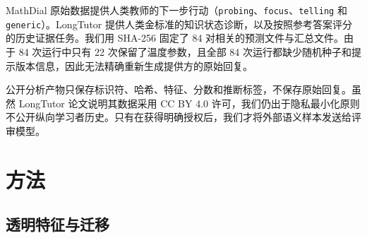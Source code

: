 \documentclass[11pt,a4paper,UTF8]{ctexart}
\begin{document}
\begin{table}[t]
  \centering
  \small
  \caption{证据来源以及保留依赖结构的分析单元。估计不确定性时，共享单元不会因为模型数量而被重复计数。}
  \label{tab:data}
\end{table}

MathDial 原始数据提供人类教师的下一步行动（\texttt{probing}、\texttt{focus}、\texttt{telling} 和 \texttt{generic}）。LongTutor 提供人类金标准的知识状态诊断，以及按照参考答案评分的历史证据任务。我们用 SHA-256 固定了 84 对相关的预测文件与汇总文件。由于 84 次运行中只有 22 次保留了温度参数，且全部 84 次运行都缺少随机种子和提示版本信息，因此无法精确重新生成提供方的原始回复。

公开分析产物只保存标识符、哈希、特征、分数和推断标签，不保存原始回复。虽然 LongTutor 论文说明其数据采用 CC BY 4.0 许可，我们仍出于隐私最小化原则不公开纵向学习者历史。只有在获得明确授权后，我们才将外部语义样本发送给评审模型。

\section{方法}

\subsection{透明特征与迁移}
\end{document}
